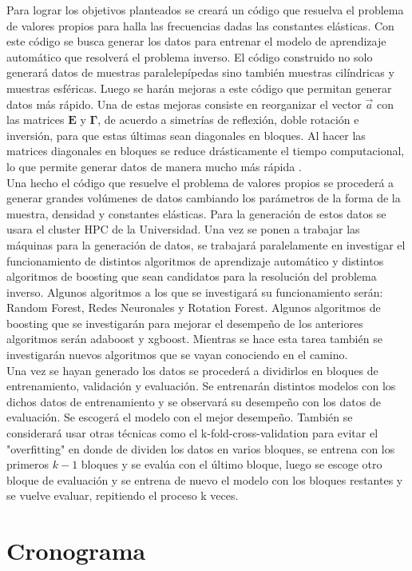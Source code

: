\documentclass[12pt]{article}
\begin{document}
Para lograr los objetivos planteados se creará un código que resuelva el problema de valores propios para halla las frecuencias dadas las constantes elásticas. Con este código se busca generar los datos para entrenar el modelo de aprendizaje automático que resolverá el problema inverso. El código construido  no solo generará datos de muestras paralelepípedas sino también muestras cilíndricas y muestras esféricas. Luego se harán mejoras a este código que permitan generar datos más rápido. Una de estas mejoras consiste en reorganizar el vector $\vec{a}$ con las matrices $\bm{E}$ y $\bm{\Gamma}$, de acuerdo a simetrías de reflexión, doble rotación e inversión, para que estas últimas sean diagonales en bloques. Al hacer las matrices diagonales en bloques se reduce drásticamente el tiempo computacional, lo que permite generar datos de manera mucho más rápida \cite{Leisure_1997}. 
\\
Una hecho el código que resuelve el problema de valores propios se procederá a generar grandes volúmenes de datos cambiando los parámetros de la forma de la muestra, densidad y constantes elásticas. Para la generación de estos datos se usara el cluster HPC de la Universidad. Una vez se ponen a trabajar las máquinas para la generación de datos, se trabajará paralelamente en investigar el funcionamiento de distintos algoritmos de aprendizaje automático y distintos algoritmos de boosting que sean candidatos para la resolución del problema inverso. Algunos algoritmos a los que se investigará su funcionamiento serán: Random Forest, Redes Neuronales y Rotation Forest. Algunos algoritmos de boosting que se investigarán para mejorar el desempeño de los anteriores algoritmos serán adaboost y xgboost. Mientras se hace esta tarea también se investigarán nuevos algoritmos que se vayan conociendo en el camino. 
\\
Una vez se hayan generado los datos se procederá a dividirlos en bloques de entrenamiento, validación y evaluación. Se entrenarán distintos modelos con los dichos datos de entrenamiento y se observará su desempeño con los datos de evaluación. Se escogerá el modelo con el mejor desempeño. También se considerará usar otras técnicas como el k-fold-cross-validation para evitar el "overfitting" en donde de dividen los datos en varios bloques, se entrena con los primeros $k-1$ bloques y se evalúa con el último bloque, luego se escoge otro bloque de evaluación y se entrena de nuevo el modelo con los bloques restantes y se vuelve evaluar, repitiendo el proceso k veces.  
\section{Cronograma}
\end{document}
